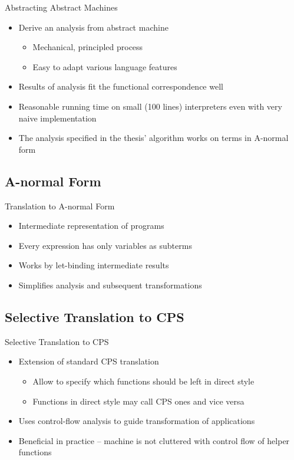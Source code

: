\documentclass{beamer}
\begin{document}
\begin{frame}{Abstracting Abstract Machines}
  \begin{itemize}
    \item Derive an analysis from abstract machine
    \begin{itemize}
      \item Mechanical, principled process
      \item Easy to adapt various language features
    \end{itemize}
    \item Results of analysis fit the functional correspondence well
    \item Reasonable running time on small (100 lines) interpreters even with very naive implementation
    \item The analysis specified in the thesis' algorithm works on terms in A-normal form
  \end{itemize}
\end{frame}


\subsection{A-normal Form}

\begin{frame}{Translation to A-normal Form}
  \begin{itemize}
    \item Intermediate representation of programs
    \item Every expression has only variables as subterms
    \item Works by let-binding intermediate results
    \item Simplifies analysis and subsequent transformations
  \end{itemize}
\end{frame}


\subsection{Selective Translation to CPS}

\begin{frame}{Selective Translation to CPS}
  \begin{itemize}
    \item Extension of standard CPS translation
    \begin{itemize}
      \item Allow to specify which functions should be left in direct style
      \item Functions in direct style may call CPS ones and vice versa
    \end{itemize}
    \item Uses control-flow analysis to guide transformation of applications
    \item Beneficial in practice -- machine is not cluttered with control flow of helper functions
  \end{itemize}
\end{frame}
\end{document}
